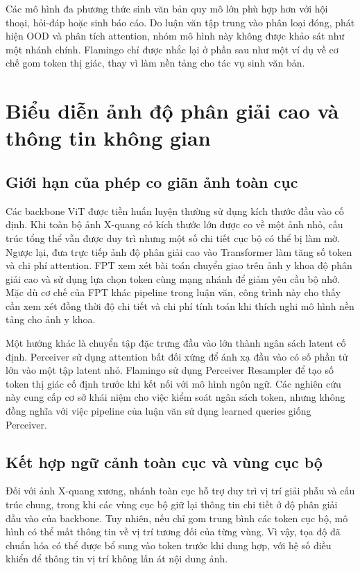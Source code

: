 Các mô hình đa phương thức sinh văn bản quy mô lớn phù hợp hơn với hội thoại, hỏi-đáp hoặc sinh báo cáo. Do luận văn tập trung vào phân loại đóng, phát hiện OOD và phân tích attention, nhóm mô hình này không được khảo sát như một nhánh chính. Flamingo \cite{Alayrac2022Flamingo} chỉ được nhắc lại ở phần sau như một ví dụ về cơ chế gom token thị giác, thay vì làm nền tảng cho tác vụ sinh văn bản.

\section{Biểu diễn ảnh độ phân giải cao và thông tin không gian}

\subsection{Giới hạn của phép co giãn ảnh toàn cục}

Các backbone ViT được tiền huấn luyện thường sử dụng kích thước đầu vào cố định. Khi toàn bộ ảnh X-quang có kích thước lớn được co về một ảnh nhỏ, cấu trúc tổng thể vẫn được duy trì nhưng một số chi tiết cục bộ có thể bị làm mờ. Ngược lại, đưa trực tiếp ảnh độ phân giải cao vào Transformer làm tăng số token và chi phí attention. FPT \cite{FPT} xem xét bài toán chuyển giao trên ảnh y khoa độ phân giải cao và sử dụng lựa chọn token cùng mạng nhánh để giảm yêu cầu bộ nhớ. Mặc dù cơ chế của FPT khác pipeline trong luận văn, công trình này cho thấy cần xem xét đồng thời độ chi tiết và chi phí tính toán khi thích nghi mô hình nền tảng cho ảnh y khoa.

Một hướng khác là chuyển tập đặc trưng đầu vào lớn thành ngân sách latent cố định. Perceiver \cite{Jaegle2021Perceiver} sử dụng attention bất đối xứng để ánh xạ đầu vào có số phần tử lớn vào một tập latent nhỏ. Flamingo \cite{Alayrac2022Flamingo} sử dụng Perceiver Resampler để tạo số token thị giác cố định trước khi kết nối với mô hình ngôn ngữ. Các nghiên cứu này cung cấp cơ sở khái niệm cho việc kiểm soát ngân sách token, nhưng không đồng nghĩa với việc pipeline của luận văn sử dụng learned queries giống Perceiver.

\subsection{Kết hợp ngữ cảnh toàn cục và vùng cục bộ}

Đối với ảnh X-quang xương, nhánh toàn cục hỗ trợ duy trì vị trí giải phẫu và cấu trúc chung, trong khi các vùng cục bộ giữ lại thông tin chi tiết ở độ phân giải đầu vào của backbone. Tuy nhiên, nếu chỉ gom trung bình các token cục bộ, mô hình có thể mất thông tin về vị trí tương đối của từng vùng. Vì vậy, tọa độ đã chuẩn hóa có thể được bổ sung vào token trước khi dung hợp, với hệ số điều khiển để thông tin vị trí không lấn át nội dung ảnh.

